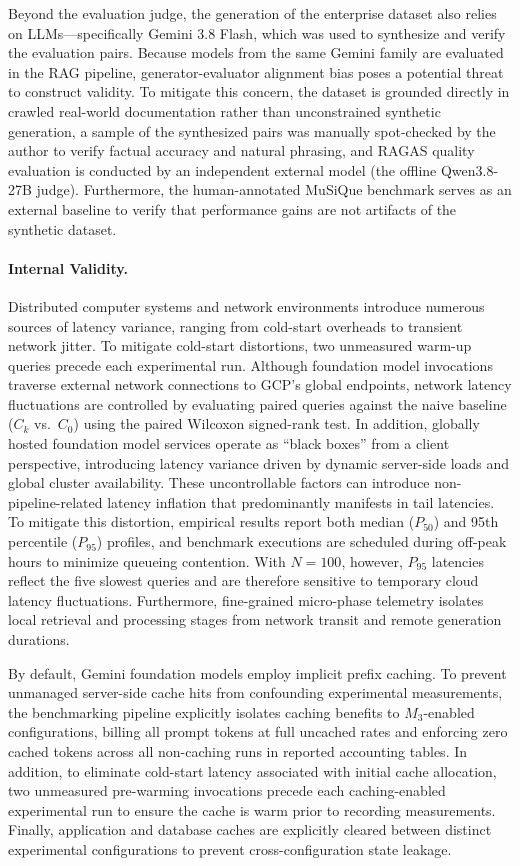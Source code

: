 Beyond the evaluation judge, the generation of the enterprise dataset also relies on LLMs---specifically Gemini 3.8 Flash, which was used to synthesize and verify the evaluation pairs. Because models from the same Gemini family are evaluated in the RAG pipeline, generator-evaluator alignment bias poses a potential threat to construct validity. To mitigate this concern, the dataset is grounded directly in crawled real-world documentation rather than unconstrained synthetic generation, a sample of the synthesized pairs was manually spot-checked by the author to verify factual accuracy and natural phrasing, and RAGAS quality evaluation is conducted by an independent external model (the offline Qwen3.8-27B judge). Furthermore, the human-annotated MuSiQue benchmark serves as an external baseline to verify that performance gains are not artifacts of the synthetic dataset.

\paragraph{Internal Validity.}
Distributed computer systems and network environments introduce numerous sources of latency variance, ranging from cold-start overheads to transient network jitter. To mitigate cold-start distortions, two unmeasured warm-up queries precede each experimental run. Although foundation model invocations traverse external network connections to GCP's global endpoints, network latency fluctuations are controlled by evaluating paired queries against the naive baseline ($C_k$ vs.\ $C_0$) using the paired Wilcoxon signed-rank test. In addition, globally hosted foundation model services operate as ``black boxes'' from a client perspective, introducing latency variance driven by dynamic server-side loads and global cluster availability. These uncontrollable factors can introduce non-pipeline-related latency inflation that predominantly manifests in tail latencies. To mitigate this distortion, empirical results report both median ($P_{50}$) and 95th percentile ($P_{95}$) profiles, and benchmark executions are scheduled during off-peak hours to minimize queueing contention. With $N = 100$, however, $P_{95}$ latencies reflect the five slowest queries and are therefore sensitive to temporary cloud latency fluctuations. Furthermore, fine-grained micro-phase telemetry isolates local retrieval and processing stages from network transit and remote generation durations.

By default, Gemini foundation models employ implicit prefix caching. To prevent unmanaged server-side cache hits from confounding experimental measurements, the benchmarking pipeline explicitly isolates caching benefits to $M_3$-enabled configurations, billing all prompt tokens at full uncached rates and enforcing zero cached tokens across all non-caching runs in reported accounting tables. In addition, to eliminate cold-start latency associated with initial cache allocation, two unmeasured pre-warming invocations precede each caching-enabled experimental run to ensure the cache is warm prior to recording measurements. Finally, application and database caches are explicitly cleared between distinct experimental configurations to prevent cross-configuration state leakage.

